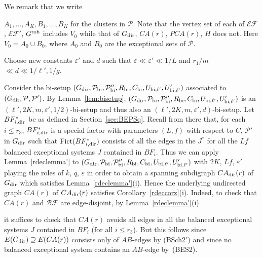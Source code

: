\documentclass{memo-l}
\def\COMMENT#1{}
\def\proof{\removelastskip\penalty55\medskip\noindent{\bf Proof. }}
\def\cP{\mathcal{P}}
\def\eps{\varepsilon}
\numberwithin{section}{chapter}
\numberwithin{equation}{section}
\numberwithin{firstthm}{section}
\numberwithin{figure}{section}
\begin{document}
{We remark that we write%
\COMMENT{osthus adapted sentence from paper4} 
$A_1,\dots,A_K,B_1,\dots,B_K$ for the clusters in $\cP$. Note that the vertex set of each of $\mathcal{EF}$, $\mathcal{EF}'$, $G^{\rm rob}$
includes $V_0$ while that of $G_{\rm dir}$, $CA(r)$, $PCA(r)$, $H$ does not.
Here $V_0=A_0\cup B_0$, where $A_0$ and $B_0$ are the exceptional sets of $\cP$.

\proof
Choose new constants $\eps'$ and $d$ such that $\eps\ll \eps'\ll 1/L$ and $r_1/m $ $\ll d\ll 1/\ell',1/g$.%
   \COMMENT{Daniela: introduced $\eps'$ which is needed since Lemma~\ref{lem:bisetup} changed. Before we had that
$(G_{\rm dir},\cP_{{\rm bi}},\cP''_{{\rm bi}},R_{{\rm bi}},C_{{\rm bi}},U_{{\rm bi},\ell'},U'_{{\rm bi},\ell'})$
is an $(\ell',2K,m,\eps^{1/2},1/2)$-bi-setup instead of just an $(\ell',2K,m,\eps',1/2)$-bi-setup. So check whether I made all the necessary changes below.}
Consider the bi-setup $(G_{\rm dir},\cP_{\rm bi},\cP''_{{\rm bi}},R_{{\rm bi}},C_{{\rm bi}},U_{{\rm bi},\ell'},U'_{{\rm bi},\ell'})$
associated to $(G_{\rm dir},\cP,\cP')$. By Lemma~\ref{lem:bisetup}, 
$(G_{\rm dir},\cP_{{\rm bi}},\cP''_{{\rm bi}},R_{{\rm bi}},C_{{\rm bi}},U_{{\rm bi},\ell'},U'_{{\rm bi},\ell'})$
is an $(\ell',2K,m,\eps',1/2)$-bi-setup and thus also an $(\ell',2K,m,\eps',d)$-bi-setup.
Let $BF^*_{i,{\rm dir}}$ be as defined in Section~\ref{sec:BEPSq}.
Recall from there that, for each $i\le r_3$, $BF^*_{i,{\rm dir}}$ is a special factor
with parameters $(L,f)$ with respect to $C$, $\mathcal P'$ in $G_{\rm dir}$ such that
${\rm Fict}(BF^*_{i,{\rm dir}})$ consists of all the edges in the $J^*$ for all the $Lf$ balanced exceptional systems $J$ contained in $BF_i$.
Thus we can apply Lemma~\ref{rdeclemma'} to $(G_{\rm dir},\cP_{{\rm bi}},\cP''_{{\rm bi}},R_{{\rm bi}},C_{{\rm bi}},U_{{\rm bi},\ell'},U'_{{\rm bi},\ell'})$
with $2K$, $Lf$, $\eps'$ playing the roles of $k$, $q$, $\eps$
in order to obtain a spanning subdigraph $CA_{{\rm dir}}(r)$
of $G_{\rm dir}$ which satisfies Lemma~\ref{rdeclemma'}(i). Hence the underlying undirected graph $CA(r)$ of
$CA_{{\rm dir}}(r)$ satisfies Corollary~\ref{rdeccorz}(i). Indeed, to check that $CA(r)$ and $\mathcal{BF}$ are edge-disjoint, by Lemma~\ref{rdeclemma'}(i)%
\COMMENT{osthus added by Lemma~\ref{rdeclemma'}(i)} 
it suffices to
check that $CA(r)$ avoids all edges in all the balanced exceptional systems $J$ contained in $BF_i$ (for all $i\le r_3$). But this
follows since $E(G_{\rm dir})\supseteq E(CA(r))$ consists only of $AB$-edges by (BSch2$'$) and since no balanced exceptional system
contains an $AB$-edge by~(BES2).%
   \COMMENT{Daniela added the last 2 sentences}

}
\end{document}
